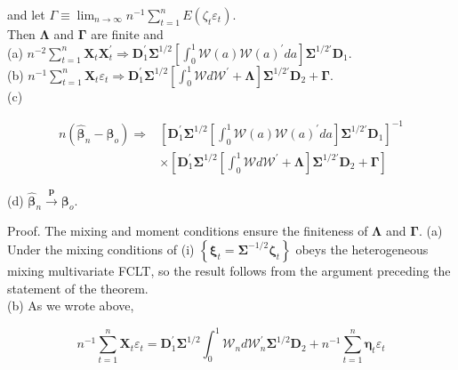 \documentclass[10pt]{article}
\begin{document}
and let $\Gamma \equiv \lim _{n \rightarrow \infty} n^{-1} \sum_{t=1}^{n} E\left(\zeta_{t} \varepsilon_{t}\right)$.\\
Then $\boldsymbol{\Lambda}$ and $\boldsymbol{\Gamma}$ are finite and\\
(a) $n^{-2} \sum_{t=1}^{n} \mathbf{X}_{t} \mathbf{X}_{t}^{\prime} \Rightarrow \mathbf{D}_{1}^{\prime} \boldsymbol{\Sigma}^{1 / 2}\left[\int_{0}^{1} \mathcal{W}(a) \mathcal{W}(a)^{\prime} d a\right] \boldsymbol{\Sigma}^{1 / 2 \prime} \mathbf{D}_{1}$.\\
(b) $n^{-1} \sum_{t=1}^{n} \mathbf{X}_{t} \varepsilon_{t} \Rightarrow \mathbf{D}_{1}^{\prime} \boldsymbol{\Sigma}^{1 / 2}\left[\int_{0}^{1} \mathcal{W} d \mathcal{W}^{\prime}+\boldsymbol{\Lambda}\right] \boldsymbol{\Sigma}^{1 / 2 \prime} \mathbf{D}_{2}+\boldsymbol{\Gamma}$.\\
(c)

$$
\begin{aligned}
n\left(\hat{\boldsymbol{\beta}}_{n}-\boldsymbol{\beta}_{o}\right) \Rightarrow & {\left[\mathbf{D}_{1}^{\prime} \boldsymbol{\Sigma}^{1 / 2}\left[\int_{0}^{1} \mathcal{W}(a) \mathcal{W}(a)^{\prime} d a\right] \boldsymbol{\Sigma}^{1 / 2 \prime} \mathbf{D}_{1}\right]^{-1} } \\
& \times\left[\mathbf{D}_{1}^{\prime} \boldsymbol{\Sigma}^{1 / 2}\left[\int_{0}^{1} \mathcal{W} d \mathcal{W}^{\prime}+\mathbf{\Lambda}\right] \boldsymbol{\Sigma}^{1 / 2 \prime} \mathbf{D}_{2}+\mathbf{\Gamma}\right]
\end{aligned}
$$

(d) $\hat{\boldsymbol{\beta}}_{n} \xrightarrow{\boldsymbol{p}} \boldsymbol{\beta}_{o}$.

Proof. The mixing and moment conditions ensure the finiteness of $\boldsymbol{\Lambda}$ and $\boldsymbol{\Gamma}$. (a) Under the mixing conditions of (i) $\left\{\boldsymbol{\xi}_{t}=\boldsymbol{\Sigma}^{-1 / 2} \boldsymbol{\zeta}_{t}\right\}$ obeys the heterogeneous mixing multivariate FCLT, so the result follows from the argument preceding the statement of the theorem.\\
(b) As we wrote above,

$$
n^{-1} \sum_{t=1}^{n} \mathbf{X}_{t} \varepsilon_{t}=\mathbf{D}_{1}^{\prime} \boldsymbol{\Sigma}^{1 / 2} \int_{0}^{1} \mathcal{W}_{n} d \mathcal{W}_{n}^{\prime} \boldsymbol{\Sigma}^{1 / 2} \mathbf{D}_{2}+n^{-1} \sum_{t=1}^{n} \boldsymbol{\eta}_{t} \varepsilon_{t}
$$
\end{document}
